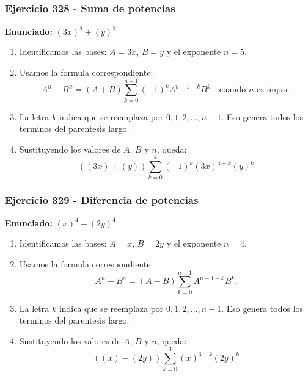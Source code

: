 \documentclass[11pt,a4paper]{article}
\begin{document}
\subsubsection*{Ejercicio 328 - Suma de potencias}
\textbf{Enunciado:} $ \left(3 x\right)^{5}+\left(y\right)^{5} $\par
\begin{enumerate}[leftmargin=2em]
\item Identificamos las bases: \(A=3 x\), \(B=y\) y el exponente \(n=5\).
\item Usamos la formula correspondiente: \[A^n+B^n=(A+B)\sum_{k=0}^{n-1}(-1)^kA^{n-1-k}B^k\quad\text{cuando }n\text{ es impar}.\]
\item La letra \(k\) indica que se reemplaza por \(0,1,2,\ldots,n-1\). Eso genera todos los terminos del parentesis largo.
\item Sustituyendo los valores de \(A\), \(B\) y \(n\), queda: \[\boxed{\left(\left(3 x\right)+\left(y\right)\right)\sum_{k=0}^{4}(-1)^k\left(3 x\right)^{4-k}\left(y\right)^k}\]
\end{enumerate}

\vspace{0.2cm}
\subsubsection*{Ejercicio 329 - Diferencia de potencias}
\textbf{Enunciado:} $ \left(x\right)^{4}-\left(2 y\right)^{4} $\par
\begin{enumerate}[leftmargin=2em]
\item Identificamos las bases: \(A=x\), \(B=2 y\) y el exponente \(n=4\).
\item Usamos la formula correspondiente: \[A^n-B^n=(A-B)\sum_{k=0}^{n-1}A^{n-1-k}B^k.\]
\item La letra \(k\) indica que se reemplaza por \(0,1,2,\ldots,n-1\). Eso genera todos los terminos del parentesis largo.
\item Sustituyendo los valores de \(A\), \(B\) y \(n\), queda: \[\boxed{\left(\left(x\right)-\left(2 y\right)\right)\sum_{k=0}^{3}\left(x\right)^{3-k}\left(2 y\right)^k}\]
\end{enumerate}

\vspace{0.2cm}
\end{document}
